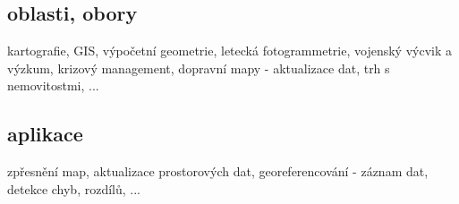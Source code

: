 \subsection{oblasti, obory}
kartografie, GIS, výpočetní geometrie, letecká fotogrammetrie, vojenský výcvik a výzkum, krizový management, dopravní mapy - aktualizace dat, trh s nemovitostmi, ...

\subsection{aplikace}
zpřesnění map, aktualizace prostorových dat, georeferencování - záznam dat, detekce chyb, rozdílů, ...

